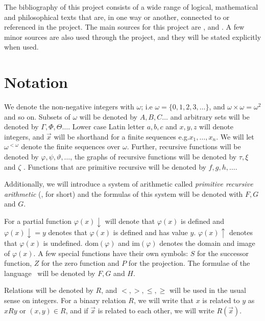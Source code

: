 \documentclass[../main.tex]{subfiles}
\begin{document}
The bibliography of this project consists of a wide range of logical,
mathematical and philosophical texts that are, in one way or another, connected to or referenced in the project. 
The main sources for this project
are \parencite{Smor1985}, \parencite{Boolos1993} and \parencite{Soare1987}. A
few minor sources are also used through the project, and they will be stated
explicitly when used.

\section{Notation}

We denote the non-negative integers with $\omega$; i.e
$\omega=\{0,1,2,3,\ldots\}$, and $\omega\times\omega=\omega^2$ and so on.
Subsets of $\omega$ will be denoted by $A,B,C\ldots$ and arbitrary sets will be
denoted by
$\Gamma,\Phi,\Theta\ldots$. Lower case Latin letter $a,b,c$ and $x,y,z$ will
denote integers, and $\vec{x}$ will be shorthand for a finite sequences e.g.$x_1,\ldots,x_n$.
We will let $\omega^{<\omega}$ denote the finite sequences over $\omega$.
Further, recursive functions will be denoted by
$\varphi,\psi,\vartheta,\ldots$, the graphs of recursive functions will be
denoted by $\tau,\xi$ and $\zeta$ . Functions that are primitive recursive will be denoted by
$f,g,h,\ldots$. 

Additionally, we  will introduce a system of arithmetic called \textit{primitive
recursive arithmetic} (\PRA, for short) and the formulas of this
system will be denoted with $F,G$ and $G$.

For a partial function $\varphi(x)\downarrow$ will denote that $\varphi(x)$ is defined and
$\varphi(x)\downarrow=y$ denotes that $\varphi(x)$ is defined and has value $y$.
$\varphi(x)\uparrow$
denotes that $\varphi(x)$ is undefined. $\text{dom}(\varphi)$ and $\text{im}
(\varphi)$ denotes the
domain and image of $\varphi(x)$.
A few special functions have their own symbols: $S$ for the
successor function, $Z$ for the zero function and $P$ for the projection.
The formulae of the language \PRA\ will be denoted by $F,G$ and $H$.

Relations will be denoted by $R$, and $<,>,\leq,\geq$ will be used in the usual
sense on integers. For a binary relation $R$, we will write that $x$ is related
to $y$ as $xRy$ or $(x,y)\in R$, and if $\vec x$ is related to each other, we
will write $R(\vec x)$.
\end{document}
